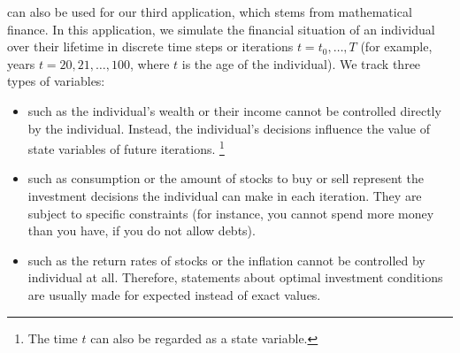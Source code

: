 
\label{chap:80finance}

can also be used for our third application,
which stems from mathematical finance.
In this application, we simulate the financial situation of an individual
over their lifetime in discrete time steps or iterations $t = t_0, \dotsc, T$
(for example, years $t = 20, 21, \dotsc, 100$, where $t$ is the age
of the individual).
We track three types of variables:

\begin{itemize}
  \item
  such as the individual's wealth or their income
  cannot be controlled directly by the individual.
  Instead, the individual's decisions influence the value of
  state variables of future iterations.%
  \footnote{%
    The time $t$ can also be regarded as a state variable.%
  }
  
  \item
  such as consumption or the amount of stocks to buy or sell
  represent the investment decisions the individual can make in
  each iteration.
  They are subject to specific constraints
  (for instance, you cannot spend more money than you have,
  if you do not allow debts).
  
  \item
  such as the return rates of stocks or the inflation
  cannot be controlled by individual at all.
  Therefore, statements about optimal investment conditions
  are usually made for expected instead of exact values.
\end{itemize}

\blindtext{}






\cleardoublepage
